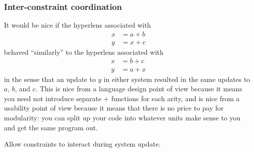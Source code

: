 \subsubsection{Inter-constraint coordination}
It would be nice if the hyperlens associated with
\begin{align*}
    x &= a+b \\
    y &= x+c
\end{align*}
behaved ``similarly'' to the hyperlens associated with
\begin{align*}
    x &= b+c \\
    y &= a+x
\end{align*}
in the sense that an update to $y$ in either system resulted in the same
updates to $a$, $b$, and $c$. This is nice from a language design point of
view because it means you need not introduce separate $+$ functions for each
arity, and is nice from a usability point of view because it means that
there is no price to pay for modularity: you can split up your code into
whatever units make sense to you and get the same program out.

\begin{desiderata}
    Allow constraints to interact during system update.
\end{desiderata}
